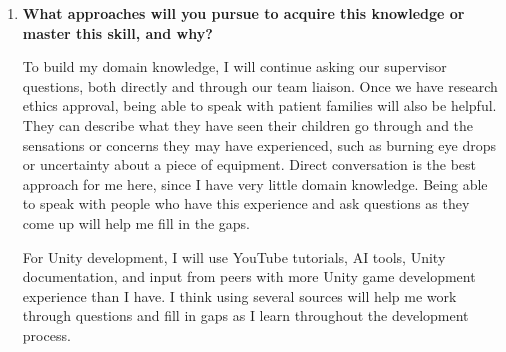 \documentclass[12pt]{article}
\begin{document}
\begin{enumerate}
    \item \textbf{What approaches will you pursue to acquire this
    knowledge or master this skill, and why?}

    To build my domain knowledge, I will continue asking our supervisor
    questions, both directly and through our team liaison. Once we have
    research ethics approval, being able to speak with patient families
    will also be helpful. They can describe what they have seen their
    children go through and the sensations or concerns they may have
    experienced, such as burning eye drops or uncertainty about a piece
    of equipment. Direct conversation is the best approach for me here,
    since I have very little domain knowledge. Being able to speak with
    people who have this experience and ask questions as they come up
    will help me fill in the gaps.

    For Unity development, I will use YouTube tutorials, AI tools, Unity
    documentation, and input from peers with more Unity game development
    experience than I have. I think using several sources will help me
    work through questions and fill in gaps as I learn throughout the
    development process.

\end{enumerate}

\newpage




\newpage
\end{document}

